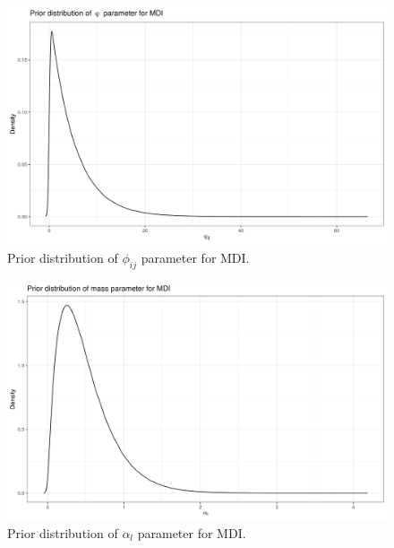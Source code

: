 \documentclass[12pt]{article} %
\begin{document}
	\begin{figure}[!htb]
		\centering
		\includegraphics[scale=0.65]{Images/Data_inspection/phi_prior.png}
		\caption{Prior distribution of $\phi_{ij}$ parameter for MDI.}
		\label{fig:mdi_phi_prior}
	\end{figure}

	\begin{figure}[!htb]
		\centering
		\includegraphics[scale=0.65]{Images/Data_inspection/alpha_prior.png}
		\caption{Prior distribution of $\alpha_l$ parameter for MDI.}
		\label{fig:mdi_alpha_prior}
	\end{figure}
\end{document}
